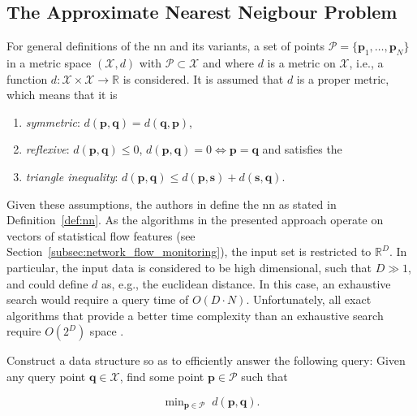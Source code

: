 \documentclass[../../../main.tex]{subfiles}
\begin{document}
\subsection{The Approximate Nearest Neigbour Problem}\label{subsec:approximate_nearest_neighbour_problem}

For general definitions of the \gls{nn} and its variants, a set of points $\mathcal{P} = \{\bm{p}_1, \dots, \bm{p}_N \}$ in a metric space $(\mathcal{X}, d)$ with $\mathcal{P} \subset \mathcal{X}$ and where $d$ is a metric on $\mathcal{X}$, i.e., a function $d: \mathcal{X} \times \mathcal{X} \rightarrow \mathbb{R}$ is considered. It is assumed that $d$ is a proper metric, which means that it is

\begin{enumerate}
    \item \textit{symmetric}: $d(\bm{p},\bm{q})=d(\bm{q},\bm{p})$,
    \item \textit{reflexive}: $d(\bm{p},\bm{q}) \leq 0$, $d(\bm{p},\bm{q})=0 \iff \bm{p}=\bm{q}$ and satisfies the 
    \item \textit{triangle inequality}: $d(\bm{p},\bm{q}) \leq d(\bm{p},\bm{s}) + d(\bm{s},\bm{q})$.
\end{enumerate}

Given these assumptions, the authors in \cite{indyk_approximate_1998} define the \gls{nn} as stated in Definition~\ref{def:nn}. As the algorithms in the presented approach operate on vectors of statistical flow features (see Section~\ref{subsec:network_flow_monitoring}), the input set is restricted to $\mathbb{R}^D$. In particular, the input data is considered to be high dimensional, such that $D \gg 1$, and could define $d$ as, e.g., the euclidean distance. In this case, an exhaustive search would require a query time of $O(D \cdot N)$. Unfortunately, all exact algorithms that provide a better time complexity than an exhaustive search require $O(2^D)$ space \cite{rubinstein2018hardness}.

\begin{definition}\label{def:nn}
    Construct a data structure so as to efficiently answer the following query: Given any query point $\bm{q} \in \mathcal{X}$, find some point $\bm{p} \in \mathcal{P}$ such that

   \begin{equation}
       \mathop{\text{min}}_{\bm{p} \in \mathcal{P}} \; d(\bm{p}, \bm{q}).
   \end{equation}
\end{definition}
\end{document}

